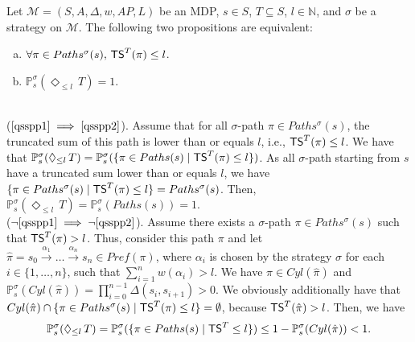 \begin{theorem} \label{spg-thm1}
  Let $\mathcal{M}=(S, A, \Delta, w, AP, L)$ be an MDP, $s \in S$, $T \subseteq S$, $l \in \mathbb{N}$, and $\sigma$ be a strategy on $\mathcal{M}$.
  The following two propositions are equivalent:
  \begin{enumerate}[(a)]
    \item $\forall \pi \in Paths^\sigma(s), \, \text{\sffamily TS}^T(\pi) \leq l$. \label{qsspp1}
    \item $\mathbb{P}_s^\sigma(\Diamond_{\leq l}\, T) = 1$. \label{qsspp2}
  \end{enumerate}
\end{theorem}
\begin{proof2}$ $\\
  ($\ref{qsspp1}\implies\ref{qsspp2}$). Assume that for all $\sigma$-path $\pi \in Paths^\sigma(s)$, the truncated sum of this path is lower than or equals $l$, i.e., $\text{\sffamily TS}^T(\pi)\leq l$.
  We have that $\mathbb{P}_s^\sigma(\Diamond_{\leq l}\, T) = \mathbb{P}_s^\sigma(\{ \pi \in Paths(s) \; | \; \text{\sffamily TS}^T(\pi) \leq l \})$. As all $\sigma$-path starting from $s$ have a truncated sum lower than or equals $l$, we have $\{\pi \in Paths^\sigma(s) \; | \; \text{\sffamily TS}^T(\pi) \leq l \} = Paths^\sigma(s)$.
  Then, $\mathbb{P}_s^\sigma(\Diamond_{\leq l}\, T) = \mathbb{P}_s^\sigma(Paths(s)) = 1$. \\
  ($\neg \ref{qsspp1} \implies \neg \ref{qsspp2}$). Assume there exists a $\sigma$-path $\pi \in Paths^\sigma(s)$ such that $\text{\sffamily TS}^T(\pi)>l$. Thus, consider this path $\pi$ and let $\hat{\pi} = s_0\xrightarrow{\alpha_1}\dots \xrightarrow{\alpha_n} s_n \in Pref(\pi)$, where $\alpha_i$ is
  chosen by the strategy $\sigma$ for each $i \in \{1, \dots, n \}$, such that $\sum_{i=1}^n w(\alpha_i) > l$.
  We have $\pi \in Cyl(\hat{\pi})$ and $\mathbb{P}_s^\sigma(Cyl(\hat{\pi})) = \prod_{i=0}^{n-1} \Delta(s_i, s_{i+1}) > 0$.
  We obviously additionally have that $Cyl(\hat{\pi}) \cap \{ \pi \in Paths^\sigma(s) \; | \; \text{\sffamily TS}^T(\pi) \leq l \} = \emptyset$, because %
  $\text{\sffamily TS}^T(\hat{\pi}) > l$.
  Then, we have
   \[\mathbb{P}_s^\sigma(\Diamond_{\leq l}\, T) = \mathbb{P}_s^\sigma(\{ \pi \in Paths(s) \; | \; \text{\sffamily TS}^T \leq l \}) \leq 1 - \mathbb{P}_s^\sigma(Cyl(\hat{\pi})) < 1.\]
\end{proof2}
\\

